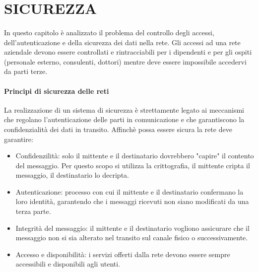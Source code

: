 \section{SICUREZZA}
\label{sec:sicurezza}
\paragraph{}
In questo capitolo è analizzato il problema del controllo degli accessi, dell'autenticazione e della sicurezza dei dati nella rete. Gli accessi ad una rete aziendale devono essere controllati e rintracciabili per i dipendenti e per gli ospiti (personale esterno, consulenti, dottori) mentre deve essere impossibile accedervi da parti terze.
\paragraph{Principi di sicurezza delle reti}
La realizzazione di un sistema di sicurezza è strettamente legato ai meccanismi che regolano l'autenticazione delle parti in comunicazione e che garantiscono la confidenzialità dei dati in transito. Affinchè possa essere sicura la rete deve garantire:
\begin{itemize}
\item Confidenzilità: solo il mittente e il destinatario dovrebbero "capire" il contento del messaggio. Per questo scopo si utilizza la crittografia, il mittente cripta il messaggio, il destinatario lo decripta.
\item Autenticazione: processo con cui il mittente e il destinatario confermano la loro identità, garantendo che i messaggi ricevuti non siano modificati da una terza parte.
\item Integrità del messaggio: il mittente e il destinatario vogliono assicurare che il messaggio non si sia alterato nel transito sul canale fisico o successivamente.
\item Accesso e disponibilità: i servizi offerti dalla rete devono essere sempre accessibili e disponibili agli utenti.
\end{itemize} 




